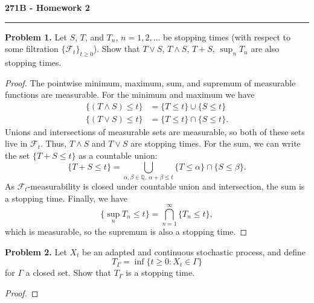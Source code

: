 \documentclass[11pt,letterpaper]{report}
\newcommand{\mcal}[1]{\mathcal{#1}}
\newcommand{\rationals}{\mathbb{Q}}
\begin{document}
\begin{center}
{\bf \Large 271B - Homework 2}
\vspace{0.2cm}
\hrule
\end{center}

\noindent\textbf{Problem 1. }
Let $S$, $T$, and $T_n$, $n = 1, 2, \ldots$ be stopping times (with respect to some filtration $\{\mcal{F}_t\}_{t\geq 0}$). Show that $T\lor S$, $T\land S$, $T+S$, $\sup_n T_n$ are also stopping times.
\begin{proof}
	The pointwise minimum, maximum, sum, and supremum of measurable functions are measurable. For the minimum and maximum we have
	\begin{align*}
		\{(T\land S) \leq t\} &= \{T\leq t\} \cup \{S\leq t\}\\
		\{(T\lor S) \leq t\} &= \{T\leq t\} \cap \{S\leq t\}.
	\end{align*}
	Unions and intersections of measurable sets are measurable, so both of these sets live in $\mcal{F}_t$. Thus, $T\land S$ and $T\lor S$ are stopping times. For the sum, we can write the set $\{T+S \leq t\}$ as a countable union:
	\[
	\{T+S \leq t\} = \bigcup_{\alpha, \beta \in \rationals,\ \alpha+\beta \leq t}\{T\leq \alpha\} \cap \{S\leq \beta\}.
	\]
	As $\mcal{F}_t$-measurability is closed under countable union and intersection, the sum is a stopping time. Finally, we have
	\[
	\{\sup_n T_n \leq t\} = \bigcap_{n=1}^\infty \{T_n \leq t\},
	\]
	which is measurable, so the supremum is also a stopping time.
\end{proof}

\noindent\textbf{Problem 2. }
Let $X_t$ be an adapted and continuous stochastic process, and define
\[
T_\Gamma = \inf\{t\geq 0: X_t\in \Gamma\}
\]
for $\Gamma$ a closed set. Show that $T_\Gamma$ is a stopping time.
\begin{proof}
	
\end{proof}
\end{document}
